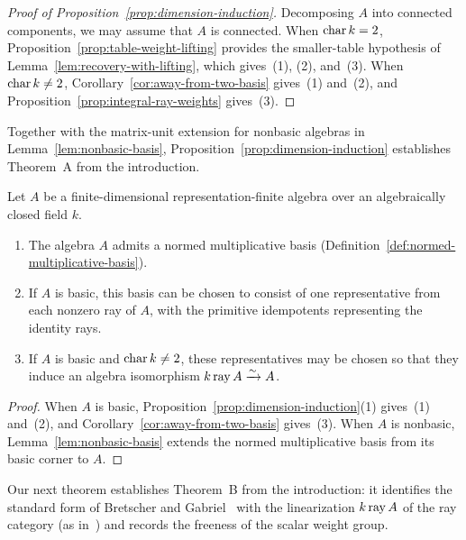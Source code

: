 \begin{proof}[Proof of Proposition~\ref{prop:dimension-induction}]
Decomposing $A$ into connected components, we may assume that $A$ is connected. When $\operatorname{char} k=2$, Proposition~\ref{prop:table-weight-lifting} provides the smaller-table hypothesis of Lemma~\ref{lem:recovery-with-lifting}, which gives~(1), (2), and~(3). When $\operatorname{char} k\ne2$, Corollary~\ref{cor:away-from-two-basis} gives~(1) and~(2), and Proposition~\ref{prop:integral-ray-weights} gives~(3).
\end{proof}

Together with the matrix-unit extension for nonbasic algebras in Lemma~\ref{lem:nonbasic-basis}, Proposition~\ref{prop:dimension-induction} establishes Theorem~A from the introduction.

\begin{theorem}
\label{thm:final-basis}
Let $A$ be a finite-dimensional representation-finite algebra over an algebraically closed field $k$.
\begin{enumerate}[label={\upshape(\arabic*)}]
\item The algebra $A$ admits a normed multiplicative basis (Definition~\ref{def:normed-multiplicative-basis}).
\item If $A$ is basic, this basis can be chosen to consist of one representative from each nonzero ray of $A$, with the primitive idempotents representing the identity rays.
\item If $A$ is basic and $\operatorname{char} k\ne2$, these representatives may be chosen so that they induce an algebra isomorphism $k\operatorname{ray} A\xrightarrow{\sim}A$.
\end{enumerate}
\end{theorem}
\begin{proof}
When $A$ is basic, Proposition~\ref{prop:dimension-induction}(1) gives~(1) and~(2), and Corollary~\ref{cor:away-from-two-basis} gives~(3). When $A$ is nonbasic, Lemma~\ref{lem:nonbasic-basis} extends the normed multiplicative basis from its basic corner to $A$.
\end{proof}

Our next theorem establishes Theorem~B from the introduction: it identifies the standard form of Bretscher and Gabriel~\cite[Section~3]{BretscherGabriel} with the linearization $k\operatorname{ray} A$ of the ray category (as in~\cite[Section~9]{BGRS}) and records the freeness of the scalar weight group.

